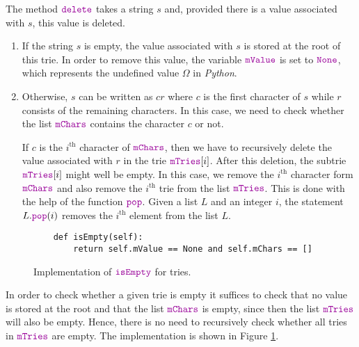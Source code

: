 The method $\mytt{delete}$ takes a string $s$ and, provided there is a value associated with $s$, this
value is deleted.
\begin{enumerate}
\item If the string $s$ is empty, the value associated with $s$ is stored at the root of this trie.
      In order to remove this value, the variable $\mytt{mValue}$ is set to $\mytt{None}$, which represents
      the undefined value $\Omega$ in \textsl{Python}.
\item Otherwise, $s$ can be written as $cr$ where $c$ is the first character of $s$ while $r$
      consists of the remaining characters.  In this case, we need to check whether the list
      $\mytt{mChars}$ contains the character $c$ or not.
 
      If $c$ is the $i^\textrm{th}$ character of $\mytt{mChars}$, then we have to recursively
      delete the value associated with $r$ in the trie $\mytt{mTries}[i]$.  
      After this deletion, the subtrie  $\mytt{mTries}[i]$ might well be empty.  In this case,
      we remove the $i^\textrm{th}$ character form $\mytt{mChars}$ and also remove the $i^\textrm{th}$ trie from the list
      $\mytt{mTries}$.  This is done with the help of the function $\mytt{pop}$.
      Given a list $L$ and an integer $i$, the statement $L.\mytt{pop}(i)$ removes the $i^\textrm{th}$ element from
      the list $L$.
\end{enumerate}

\begin{figure}[!ht]
\centering
\begin{verbatim}
    def isEmpty(self):
        return self.mValue == None and self.mChars == []
\end{verbatim}
\vspace*{-0.3cm}
\caption{Implementation of $\mytt{isEmpty}$ for tries.}
\label{fig:trie.ipython-isEmpty}
\end{figure}

In order to check whether a given trie is empty it suffices to check that no value is stored at the root
and that the list $\mytt{mChars}$ is empty, since then the list $\mytt{mTries}$ will also be empty.  Hence,
there is no need to recursively check whether all tries in $\mytt{mTries}$ are empty.  
The implementation is shown in Figure \ref{fig:trie.ipython-isEmpty}.

